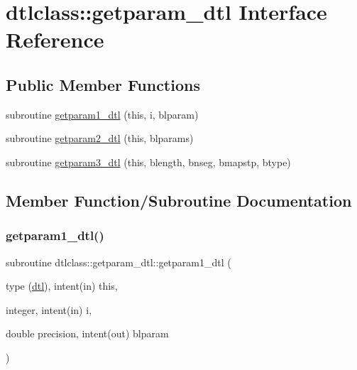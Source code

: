 \hypertarget{interfacedtlclass_1_1getparam__dtl}{}\section{dtlclass\+::getparam\+\_\+dtl Interface Reference}
\label{interfacedtlclass_1_1getparam__dtl}
\subsection*{Public Member Functions}
\begin{DoxyCompactItemize}
\item 
subroutine \mbox{\hyperlink{interfacedtlclass_1_1getparam__dtl_af31ae113bcd95d90e19695513db288a4}{getparam1\+\_\+dtl}} (this, i, blparam)
\item 
subroutine \mbox{\hyperlink{interfacedtlclass_1_1getparam__dtl_a2ef7f4b6d8987a7cdf38e600dbda2f56}{getparam2\+\_\+dtl}} (this, blparams)
\item 
subroutine \mbox{\hyperlink{interfacedtlclass_1_1getparam__dtl_a9b40f49372f1eaec16eb1248b3d44e8f}{getparam3\+\_\+dtl}} (this, blength, bnseg, bmapstp, btype)
\end{DoxyCompactItemize}


\subsection{Member Function/\+Subroutine Documentation}
\mbox{\label{interfacedtlclass_1_1getparam__dtl_af31ae113bcd95d90e19695513db288a4}} 
\subsubsection{\texorpdfstring{getparam1\_dtl()}{getparam1\_dtl()}}
{\footnotesize\ttfamily subroutine dtlclass\+::getparam\+\_\+dtl\+::getparam1\+\_\+dtl (\begin{DoxyParamCaption}\item[{type (\mbox{\hyperlink{namespacedtlclass_structdtlclass_1_1dtl}{dtl}}), intent(in)}]{this,  }\item[{integer, intent(in)}]{i,  }\item[{double precision, intent(out)}]{blparam }\end{DoxyParamCaption})}

